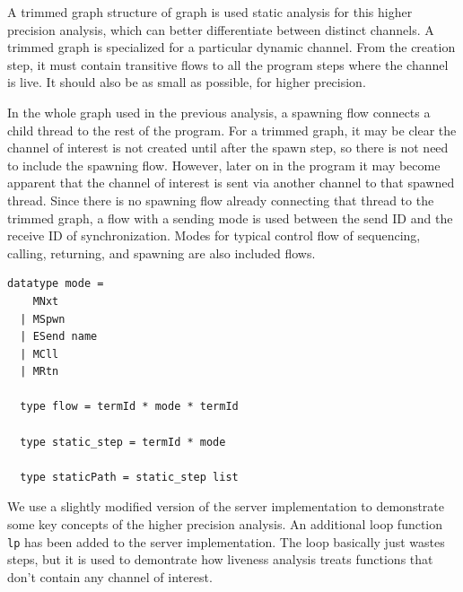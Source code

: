 \documentclass[10pt]{article}
\begin{document}
A trimmed graph structure of graph is used static analysis for this higher precision
analysis, which can better differentiate between distinct channels. 
A trimmed graph is specialized for a particular dynamic channel.  From the creation
step, it must contain transitive flows to all the program steps where the
channel is live. It should also be as small as possible, for higher precision.

In the whole graph used in the previous analysis, a spawning flow
connects a child thread to the rest of the program.  For a trimmed graph,
it may be clear the channel of interest is not created until after the spawn step,
so there is not need to include the spawning flow.  However, later on in the
program it may become apparent that the channel of interest is sent via another channel to
that spawned thread.  Since there is no spawning flow already connecting that
thread to the trimmed graph, a flow with a sending mode is used between the
send ID and the receive ID of synchronization. Modes for typical control flow of
sequencing, calling, returning, and spawning are also included flows.

\begin{lstlisting}[language=logic, mathescape]
  datatype mode =
    MNxt
  | MSpwn
  | ESend name
  | MCll
  | MRtn

  type flow = termId * mode * termId

  type static_step = termId * mode

  type staticPath = static_step list
\end{lstlisting}

We use a slightly modified version of the server implementation
to demonstrate some key concepts of the higher precision analysis.
An additional loop function \lstinline{lp} has been added to the
server implementation. The loop basically just wastes steps, but it is used to demontrate how
liveness analysis treats functions that don't contain any channel of interest.
\end{document}
